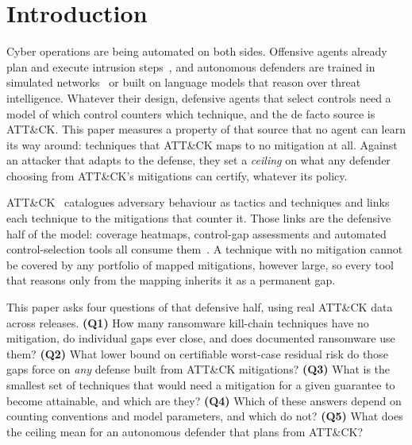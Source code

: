 \documentclass[conference,compsoc]{IEEEtran}
\begin{document}
\section{Introduction}
Cyber operations are being automated on both sides. Offensive agents already plan and
execute intrusion steps~\cite{deng2024pentestgpt}, and autonomous defenders are trained
in simulated networks~\cite{standen2021cyborg} or built on language models that reason
over threat intelligence. Whatever their design, defensive agents that select controls
need a model of which control counters which technique, and the de facto source is
ATT\&CK. This paper measures a property of that source that no agent can learn its way
around: techniques that ATT\&CK maps to no mitigation at all. Against an attacker that
adapts to the defense, they set a \emph{ceiling} on what any defender choosing from
ATT\&CK's mitigations can certify, whatever its policy.

ATT\&CK~\cite{strom2018} catalogues adversary behaviour as tactics and techniques and
links each technique to the mitigations that counter it. Those links are the defensive
half of the model: coverage heatmaps, control-gap assessments and automated
control-selection tools all consume them~\cite{roy2023sok,alsada2024}. A technique with
no mitigation cannot be covered by any portfolio of mapped mitigations, however large,
so every tool that reasons only from the mapping inherits it as a permanent gap.

This paper asks four questions of that defensive half, using real ATT\&CK data across
releases. \textbf{(Q1)} How many ransomware kill-chain techniques have no mitigation, do
individual gaps ever close, and does documented ransomware use them? \textbf{(Q2)} What lower bound on certifiable worst-case residual
risk do those gaps force on \emph{any} defense built from ATT\&CK mitigations?
\textbf{(Q3)} What is the smallest set of techniques that would need a mitigation for a
given guarantee to become attainable, and which are they? \textbf{(Q4)} Which of these
answers depend on counting conventions and model parameters, and which do not?
\textbf{(Q5)} What does the ceiling mean for an autonomous defender that plans from
ATT\&CK?
\end{document}
